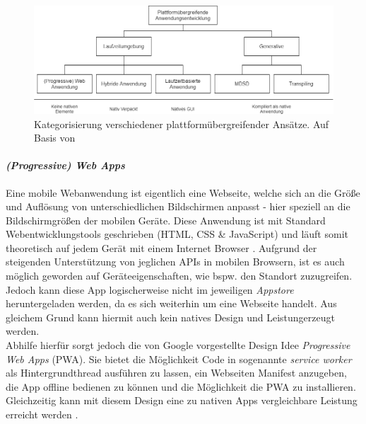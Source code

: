 \begin{figure}[tbt]
	\begin{center}
		\includegraphics[scale=0.47]{Theoretische_Grundlagen/images/crossplattform_unterteilung.png}
	\end{center}
	\caption[Kategorisierung verschiedener plattformübergreifender Ansätze]{Kategorisierung verschiedener plattformübergreifender Ansätze. Auf Basis von \cite{majchrzak2015} \protect}
	\label{fig:crossplattform_architecture}
\end{figure}

\paragraph{\textit{(Progressive) Web Apps}}
Eine mobile Webanwendung ist eigentlich eine Webseite, welche sich an die Größe und Auflösung von unterschiedlichen Bildschirmen anpasst - hier speziell an die Bildschirmgrößen der mobilen Geräte. Diese Anwendung ist mit Standard Webentwicklungstools geschrieben (HTML, CSS \& JavaScript) und läuft somit theoretisch auf jedem Gerät mit einem Internet Browser \cite{charland2011}.
Aufgrund der steigenden Unterstützung von jeglichen APIs in mobilen Browsern, ist es auch möglich geworden auf Geräteeigenschaften, wie bspw. den Standort zuzugreifen.\\
Jedoch kann diese App logischerweise nicht im jeweiligen \textit{Appstore} heruntergeladen werden, da es sich weiterhin um eine Webseite handelt.
Aus gleichem Grund kann hiermit auch kein \glqq natives Design und Leistung\grqq erzeugt werden.\\

\noindent
Abhilfe hierfür sorgt jedoch die von Google vorgestellte Design Idee \textit{Progressive Web Apps} (PWA). Sie bietet die Möglichkeit Code in sogenannte \textit{service worker} als Hintergrundthread ausführen zu lassen, ein Webseiten Manifest anzugeben, die App offline bedienen zu können und die Möglichkeit die PWA zu installieren. Gleichzeitig kann mit diesem Design eine zu nativen Apps vergleichbare Leistung erreicht werden \cite{bjorn-hansen2020}. \\

